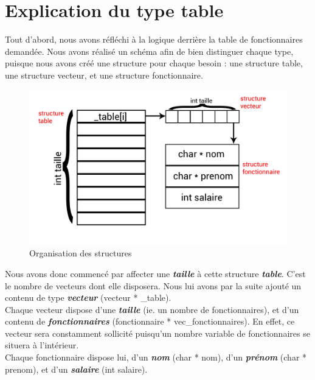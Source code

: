 \chapter*{\textcolor{carmillon}{Explication du type table}}
Tout d'abord, nous avons réfléchi à la logique derrière la table de fonctionnaires demandée. Nous avons réalisé un schéma afin de bien distinguer chaque type, puisque nous avons créé une structure pour chaque besoin : une structure table, une structure vecteur, et une structure fonctionnaire.
\begin{figure}[H]
	\begin{center}
		\includegraphics[scale=0.15]{img/schema.png}
		\caption{Organisation des structures}
	\end{center}
\end{figure}
Nous avons donc commencé par affecter une \textbf{\emph{taille}} à cette structure \textbf{\emph{table}}. C'est le nombre de vecteurs dont elle disposera. Nous lui avons par la suite ajouté un contenu de type \textbf{\emph{vecteur}} (vecteur * \_table).\\
Chaque vecteur dispose d'une \textbf{\emph{taille}} (ie. un nombre de fonctionnaires), et d'un contenu de \textbf{\emph{fonctionnaires}} (fonctionnaire * vec\_fonctionnaires). En effet, ce vecteur sera constamment sollicité puisqu'un nombre variable de fonctionnaires se situera à l'intérieur.\\Chaque fonctionnaire dispose lui, d'un \textbf{\emph{nom}} (char * nom), d'un \textbf{\emph{prénom}} (char * prenom), et d'un \textbf{\emph{salaire}} (int salaire).

